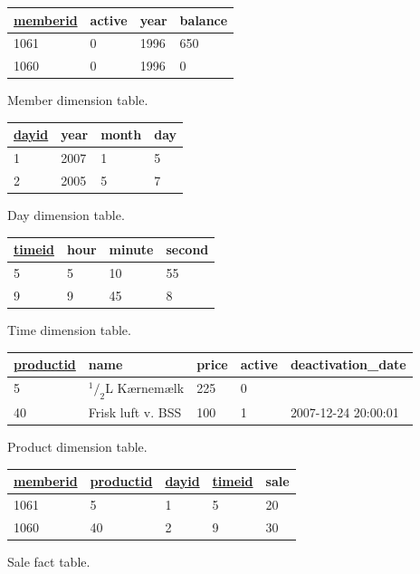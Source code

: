 \begin{figure}[H]
    \centering
    \begin{tabular}{|l|l|l|l|}
        \hline
        \underline{memberid}        & active    & year & balance    \\ \hline
        1061                        & 0         & 1996 & 650        \\ \hline
        1060                        & 0         & 1996 & 0          \\ \hline
    \end{tabular}
    \caption{Member dimension table.}
    \label{fig:member_scheme}
\vspace{0.5cm}
    \begin{tabular}{|l|l|l|l|}
        \hline
        \underline{dayid}       & year      & month & day   \\ \hline
        1                       & 2007      & 1     & 5     \\ \hline
        2                       & 2005      & 5     & 7     \\ \hline
    \end{tabular}
    \caption{Day dimension table.}
    \label{fig:day_scheme}
\vspace{0.5cm}
    \begin{tabular}{|l|l|l|l|}
        \hline
        \underline{timeid}      & hour      & minute    & second    \\ \hline
        5                       & 5         & 10        & 55        \\ \hline
        9                       & 9         & 45        & 8         \\ \hline
    \end{tabular}
    \caption{Time dimension table.}
    \label{fig:time_scheme}
\vspace{0.5cm}
    \begin{tabular}{|l|l|l|l|l|}
        \hline
        \underline{productid}   & name                  & price     & active    & deactivation\_date    \\ \hline
        5                       & $^1/_2$L Kærnemælk    & 225       & 0         &                       \\ \hline
        40                      & Frisk luft v. BSS     & 100       & 1         & 2007-12-24 20:00:01   \\ \hline
    \end{tabular}
    \caption{Product dimension table.}
    \label{fig:product_scheme}
\vspace{0.5cm}
    \begin{tabular}{|l|l|l|l|l|}
        \hline
        \underline{memberid}    & \underline{productid}     & \underline{dayid}     & \underline{timeid}    & sale  \\ \hline
        1061                    & 5                         & 1                     & 5                     & 20    \\ \hline
        1060                    & 40                        & 2                     & 9                     & 30    \\ \hline
    \end{tabular}
    \caption{Sale fact table.}
    \label{fig:sale_scheme}
\end{figure}